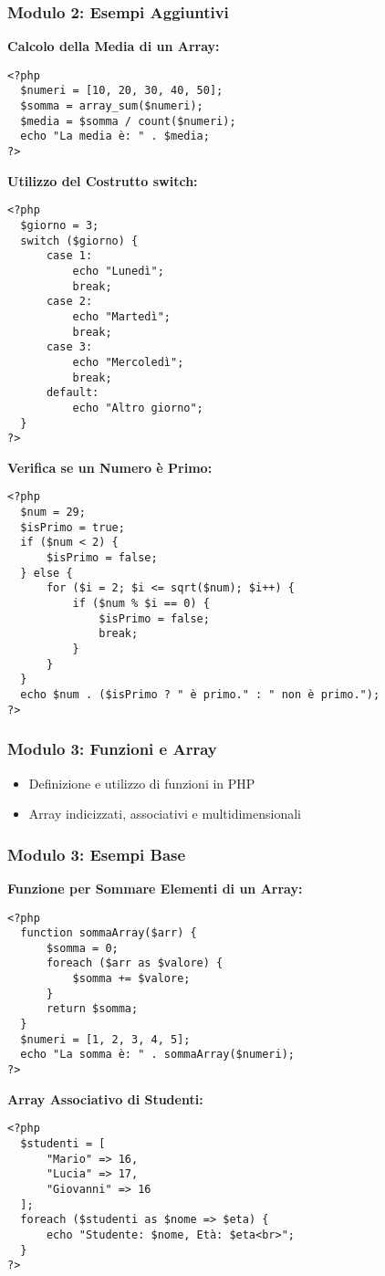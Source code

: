 \documentclass{beamer}
\begin{document}
\begin{frame}[fragile]
\frametitle{Modulo 2: Esempi Aggiuntivi}
\textbf{Calcolo della Media di un Array:}
\begin{lstlisting}
<?php
  $numeri = [10, 20, 30, 40, 50];
  $somma = array_sum($numeri);
  $media = $somma / count($numeri);
  echo "La media è: " . $media;
?>
\end{lstlisting}
\vspace{0.5em}
\textbf{Utilizzo del Costrutto switch:}
\begin{lstlisting}
<?php
  $giorno = 3;
  switch ($giorno) {
      case 1:
          echo "Lunedì";
          break;
      case 2:
          echo "Martedì";
          break;
      case 3:
          echo "Mercoledì";
          break;
      default:
          echo "Altro giorno";
  }
?>
\end{lstlisting}
\vspace{0.5em}
\textbf{Verifica se un Numero è Primo:}
\begin{lstlisting}
<?php
  $num = 29;
  $isPrimo = true;
  if ($num < 2) {
      $isPrimo = false;
  } else {
      for ($i = 2; $i <= sqrt($num); $i++) {
          if ($num % $i == 0) {
              $isPrimo = false;
              break;
          }
      }
  }
  echo $num . ($isPrimo ? " è primo." : " non è primo.");
?>
\end{lstlisting}
\end{frame}


\begin{frame}
\frametitle{Modulo 3: Funzioni e Array}
\begin{itemize}
    \item Definizione e utilizzo di funzioni in PHP
    \item Array indicizzati, associativi e multidimensionali
\end{itemize}
\end{frame}

\begin{frame}[fragile]
\frametitle{Modulo 3: Esempi Base}
\textbf{Funzione per Sommare Elementi di un Array:}
\begin{lstlisting}
<?php
  function sommaArray($arr) {
      $somma = 0;
      foreach ($arr as $valore) {
          $somma += $valore;
      }
      return $somma;
  }
  $numeri = [1, 2, 3, 4, 5];
  echo "La somma è: " . sommaArray($numeri);
?>
\end{lstlisting}
\vspace{0.5em}
\textbf{Array Associativo di Studenti:}
\begin{lstlisting}
<?php
  $studenti = [
      "Mario" => 16,
      "Lucia" => 17,
      "Giovanni" => 16
  ];
  foreach ($studenti as $nome => $eta) {
      echo "Studente: $nome, Età: $eta<br>";
  }
?>
\end{lstlisting}
\end{frame}
\end{document}
